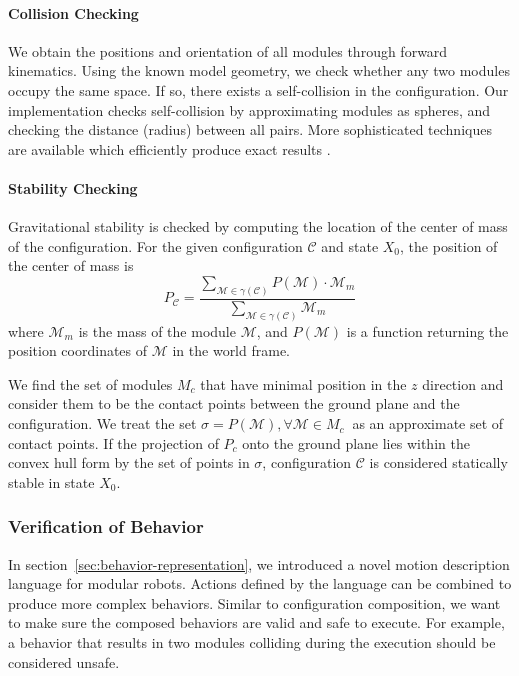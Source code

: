 \documentclass[conference]{IEEEtran}
\theoremstyle{definition}
\begin{document}
\paragraph{Collision Checking} 
We obtain the positions and orientation of all modules through forward kinematics.
Using the known model geometry, we  check whether any two modules occupy the same space. If so, there exists a self-collision in the configuration.
Our implementation checks self-collision by approximating modules as spheres, and checking
the distance (radius) between all pairs. More sophisticated techniques are available which
efficiently produce exact results \cite{pan2012fcl}.
\paragraph{Stability Checking}
 Gravitational stability is checked by computing the location of the center of mass of the configuration. For the given configuration $\mathcal{C}$
and state \(X_0\), the position of the center of mass is
\begin{equation*}
 P_{\mathcal{C}}=\dfrac{\sum\limits_{\mathcal{M}\in \gamma(\mathcal{C})}{P(\mathcal{M})\cdot \mathcal{M}_m}}{\sum\limits_{\mathcal{M}\in \gamma(\mathcal{C})}{\mathcal{M}_m}}
\end{equation*}
where $\mathcal{M}_m$ is the mass of the module $\mathcal{M}$, and \(P(\mathcal{M})\)
is a function returning the position coordinates of \(\mathcal{M}\) in the world frame.

We find the set of modules $M_c$ that have minimal position in the $z$ direction and consider them to
be the contact points between the ground plane and the configuration. We treat the
set \( \sigma = P(\mathcal{M}), \forall \mathcal{M} \in M_c \ \) as an approximate set of contact points.
If the projection of \(P_c\) onto the ground plane lies within the convex hull form by the set of points in \(\sigma\),
 configuration $\mathcal{C}$ is considered statically stable in state \(X_0\).

\subsubsection{Verification of Behavior}
In section~\ref{sec:behavior-representation}, we introduced a novel motion description language for modular robots. Actions defined by the language can be combined to produce more complex behaviors. Similar to configuration composition, we want to make sure the composed behaviors are valid and safe to execute. For example, a behavior that results in two modules colliding during the execution should be considered unsafe.
\end{document}
